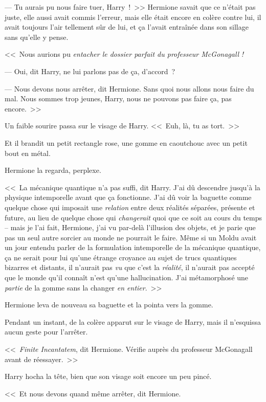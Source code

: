--- Tu aurais pu nous faire tuer, Harry~!~>> Hermione savait que ce n'était pas juste, elle aussi avait commis l'erreur, mais elle était encore en colère contre lui, il avait toujours l'air tellement sûr de lui, et ça l'avait entraînée dans son sillage sans qu'elle y pense.

<<~Nous aurions pu \emph{entacher le dossier parfait du professeur McGonagall} \emph{!}

--- Oui, dit Harry, ne lui parlons pas de ça, d'accord~?

--- Nous devons nous arrêter, dit Hermione. Sans quoi nous allons nous faire du mal. Nous sommes trop jeunes, Harry, nous ne pouvons pas faire ça, pas encore.~>>

Un faible sourire passa sur le visage de Harry. <<~Euh, là, tu as tort.~>>

Et il brandit un petit rectangle rose, une gomme en caoutchouc avec un petit bout en métal.

Hermione la regarda, perplexe.

<<~La mécanique quantique n'a pas suffi, dit Harry. J'ai dû descendre jusqu'à la physique intemporelle avant que ça fonctionne. J'ai dû voir la baguette comme quelque chose qui imposait une \emph{relation} entre deux réalités séparées, présente et future, au lieu de quelque chose qui \emph{changerait} quoi que ce soit au cours du temps -- mais je l'ai fait, Hermione, j'ai vu par-delà l'illusion des objets, et je parie que pas un seul autre sorcier au monde ne pourrait le faire. Même si un Moldu avait un jour entendu parler de la formulation intemporelle de la mécanique quantique, ça ne serait pour lui qu'une étrange croyance au sujet de trucs quantiques bizarres et distants, il n'aurait pas \emph{vu} que c'est la \emph{réalité}, il n'aurait pas accepté que le monde qu'il connaît n'est qu'une hallucination. J'ai métamorphosé une \emph{partie} de la gomme sans la changer \emph{en entier}.~>>

Hermione leva de nouveau sa baguette et la pointa vers la gomme.

Pendant un instant, de la colère apparut sur le visage de Harry, mais il n'esquissa aucun geste pour l'arrêter.

<<~\emph{Finite Incantatem}, dit Hermione. Vérifie auprès du professeur McGonagall avant de réessayer.~>>

Harry hocha la tête, bien que son visage soit encore un peu pincé.

<<~Et nous devons quand même arrêter, dit Hermione.

